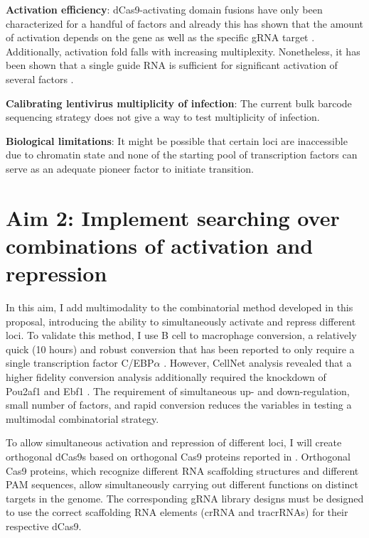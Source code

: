 \documentclass[10pt]{article}
\begin{document}
\textbf{Activation efficiency}: dCas9-activating domain fusions have only been characterized for a handful of factors and already this has shown that the amount of activation depends on the gene as well as the specific gRNA target \cite{chavez2015VPR, konermann2014genome}. Additionally, activation fold falls with increasing multiplexity. Nonetheless, it has been shown that a single guide RNA is sufficient for significant activation of several factors \cite{konermann2014genome}.
\newline

\noindent \textbf{Calibrating lentivirus multiplicity of infection}: The current bulk barcode sequencing strategy does not give a way to test multiplicity of infection.
\newline

\noindent \textbf{Biological limitations}: It might be possible that certain loci are inaccessible due to chromatin state and none of the starting pool of transcription factors can serve as an adequate pioneer factor to initiate transition.

\section{Aim 2: Implement searching over combinations of activation and repression}

In this aim, I add multimodality to the combinatorial method developed in this proposal, introducing the ability to simultaneously activate and repress different loci. To validate this method, I use  B cell to macrophage conversion, a relatively quick (10 hours) and robust conversion that has been reported to only require a single transcription factor C/EBP$\alpha$ \cite{bussmann2009robust}. However, CellNet analysis revealed that a higher fidelity conversion analysis additionally required the knockdown of Pou2af1 and Ebf1 \cite{morris2014dissecting}. The requirement of simultaneous up- and down-regulation, small number of factors, and rapid conversion reduces the variables in testing a multimodal combinatorial strategy.

To allow simultaneous activation and repression of different loci, I will create orthogonal dCas9s based on orthogonal Cas9 proteins reported in \cite{esvelt2013orthogonal}. Orthogonal Cas9 proteins, which recognize different RNA scaffolding structures and different PAM sequences, allow simultaneously carrying out different functions on distinct targets in the genome. The corresponding gRNA library designs must be designed to use the correct scaffolding RNA elements (crRNA and tracrRNAs) for their respective dCas9.
\end{document}
